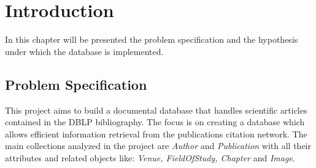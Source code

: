 \documentclass{Configuration_Files/PoliMi3i_thesis}
\begin{document}


\pagestyle{empty} %
\frontmatter %


\startpreamble
\setcounter{page}{1} %


\thispagestyle{empty}
\tableofcontents %
\thispagestyle{empty}
\cleardoublepage

\mainmatter %

\chapter{Introduction}
\label{ch:introduction}
In this chapter will be presented the problem specification and the hypothesis under which the database is implemented.

\section{Problem Specification}
This project aims to build a documental database that handles scientific articles contained in the DBLP bibliography.
The focus is on creating a database which allows efficient information retrieval from the publications citation network.
The main collections analyzed in the project are \emph{Author} and \emph{Publication} with all their attributes and related
objects like: \emph{Venue, FieldOfStudy, Chapter} and \emph{Image}.
\end{document}
